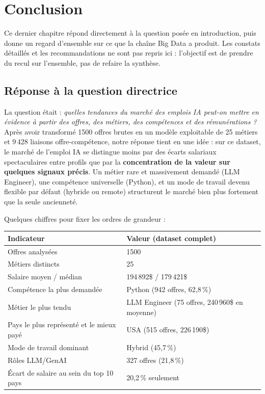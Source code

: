 \chapter{Conclusion}

Ce dernier chapitre répond directement à la question posée en
introduction, puis donne un regard d'ensemble sur ce que la chaîne Big
Data a produit. Les constats détaillés et les recommandations ne sont
pas repris ici : l'objectif est de prendre du recul sur l'ensemble, pas
de refaire la synthèse.

\section{Réponse à la question directrice}

La question était : \emph{quelles tendances du marché des emplois IA
peut-on mettre en évidence à partir des offres, des métiers, des
compétences et des rémunérations ?} Après avoir transformé 1500 offres
brutes en un modèle exploitable de 25 métiers et 9\,428 liaisons
offre-compétence, notre réponse tient en une idée : sur ce dataset, le
marché de l'emploi IA se distingue moins par des écarts salariaux
spectaculaires entre profils que par la \textbf{concentration de la
valeur sur quelques signaux précis}. Un métier rare et massivement
demandé (LLM Engineer), une compétence universelle (Python), et un mode
de travail devenu flexible par défaut (hybride ou remote) structurent le
marché bien plus fortement que la seule ancienneté.

Quelques chiffres pour fixer les ordres de grandeur :

\begin{center}
\begin{tabular}{ll}
\toprule
Indicateur & Valeur (dataset complet) \\
\midrule
Offres analysées & 1500 \\
Métiers distincts & 25 \\
Salaire moyen / médian & 194\,892\$ / 179\,421\$ \\
Compétence la plus demandée & Python (942 offres, 62,8\,\%) \\
Métier le plus tendu & LLM Engineer (75 offres, 240\,960\$ en moyenne) \\
Pays le plus représenté et le mieux payé & USA (515 offres, 226\,190\$) \\
Mode de travail dominant & Hybrid (45,7\,\%) \\
Rôles LLM/GenAI & 327 offres (21,8\,\%) \\
Écart de salaire au sein du top 10 pays & 20,2\,\% seulement \\
\bottomrule
\end{tabular}
\end{center}

